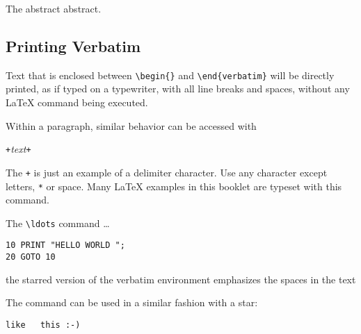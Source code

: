 \newenvironment{abstract}%
        {\begin{center}\begin{small}\begin{minipage}{0.8\textwidth}}%
        {\end{minipage}\end{small}\end{center}}
\begin{example}
\begin{abstract}
The abstract abstract.
\end{abstract}
\end{example}

\subsection{Printing Verbatim}

Text that is enclosed between \verb|\begin{|\verb|}| and
\verb|\end{verbatim}| will be directly printed, as if typed on a
typewriter, with all line breaks and spaces, without any \LaTeX{}
command being executed.

Within a paragraph, similar behavior can be accessed with
\begin{lscommand}
\verb|+|\emph{text}\verb|+|
\end{lscommand}
\noindent The \verb|+| is just an example of a delimiter character. Use any
character except letters, \verb|*| or space. Many \LaTeX{} examples in this
booklet are typeset with this command.

\begin{example}
The \verb|\ldots| command \ldots

\begin{verbatim}
10 PRINT "HELLO WORLD ";
20 GOTO 10
\end{verbatim}
\end{example}

\begin{example}
\begin{verbatim*}
the starred version of
the      verbatim
environment emphasizes
the spaces   in the text
\end{verbatim*}
\end{example}

The  command can be used in a similar fashion with a star:

\begin{example}
\verb*|like   this :-) |
\end{example}

